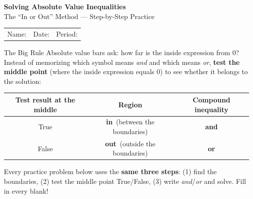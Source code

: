 \documentclass[11pt]{article}
\newcommand{\In}{\textbf{\color{FangGreen}in}}
\newcommand{\Out}{\textbf{\color{FangRed}out}}
\begin{document}
\begin{tcolorbox}[enhanced, arc=6pt,
  colback=FangBlue, colframe=FangGreen, boxrule=2.2pt,
  left=12pt, right=12pt, top=10pt, bottom=10pt]
  \begin{center}
    {\color{white}\fontsize{19}{23}\selectfont\bfseries
      Solving Absolute Value Inequalities}\\[4pt]
    {\color{FangLight}\normalsize The ``In or Out'' Method --- Step-by-Step Practice}
  \end{center}
\end{tcolorbox}

\vspace{6pt}
\begin{tcolorbox}[colback=FangLight, colframe=FangBlue!50, arc=3pt, boxrule=0.8pt,
  left=8pt, right=8pt, top=5pt, bottom=5pt]
\begin{tabular}{p{6cm} p{4cm} p{4cm}}
Name:\;\underline{\hspace{5cm}} &
Date:\;\underline{\hspace{2.8cm}} &
Period:\;\underline{\hspace{2cm}}
\end{tabular}
\end{tcolorbox}

\vspace{8pt}
\begin{stepbox}{The Big Rule}
Absolute value bars ask: how far is the inside expression from $0$? Instead of memorizing which symbol
means \emph{and} and which means \emph{or}, \textbf{test the middle point} (where the inside expression
equals $0$) to see whether it belongs to the solution:
\begin{center}
\renewcommand{\arraystretch}{1.3}
\begin{tabular}{|c|c|c|}
\hline
\textbf{Test result at the middle} & \textbf{Region} & \textbf{Compound inequality} \\\hline
True & \In\ (between the boundaries) & \textbf{and} \\\hline
False & \Out\ (outside the boundaries) & \textbf{or} \\\hline
\end{tabular}
\end{center}
Every practice problem below uses the \textbf{same three steps}: (1) find the boundaries, (2) test the
middle point True/False, (3) write \emph{and}/\emph{or} and solve. Fill in every blank!
\end{stepbox}
\end{document}
